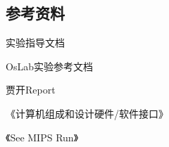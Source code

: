     \subsection{参考资料}
        实验指导文档

        OsLab实验参考文档

        贾开Report

        《计算机组成和设计硬件/软件接口》

        《See MIPS Run》


